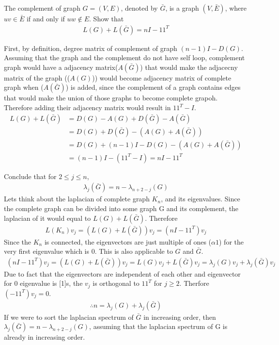 \documentclass{article}
\begin{document}
\begin{problem}
    The complement of graph $G = (V,E)$, denoted by $\bar{G}$, is a graph $(V,\bar{E})$, where $uv \in \bar{E}$ if and only if $uw \notin E$. Show that 
    \begin{align*}
        L(G) + L(\bar{G}) = nI -11^T
    \end{align*}
    
    First, by definition, degree matrix of complement of graph $(n-1)I - D(G)$. Assuming that the graph and the complement do not have self loop, complement graph would have a adjacency matrix($A(\bar{G})$) that would make the adjacecny matrix of the graph (($A(G)$)) would become adjacency matrix of complete graph when ($A(\bar{G})$) is added, since the complement of a graph contains edges that would make the union of those graphs to become complete grapoh. Therefore adding their adjacency matrix would result in $11^T - I$.
    \begin{align*}
        L(G) + L(\bar{G}) &= D(G) - A(G) + D(\bar{G}) - A(\bar{G})\\
        &= D(G) + D(\bar{G}) - (A(G)+ A(\bar{G}))\\
        &= D(G) + (n-1)I - D(G)- (A(G)+ A(\bar{G}))\\
        &= (n-1)I - (11^T - I) = nI -11^T
    \end{align*}

    Conclude that for $2 \leq j \leq n$,
    \begin{align*}
        \lambda_j (\bar{G}) = n - \lambda_{n+2-j}(G)
    \end{align*}
    Lets think about the laplacian of complete graph $K_n$, and its eigenvalues. Since the complete graph can be divided into some graph G and its complement, the laplacian of it would equal to $L(G) + L(\bar{G})$. Therefore 
    \begin{align*}
        L(K_n) v_j = (L(G) + L(\bar{G})) v_j = (nI -11^T) v_j
    \end{align*}
    Since the $K_n$ is connected, the eigenvectors are just multiple of ones ($\alpha 1$) for the very first eigenvalue which is 0. This is also applicable to $G$ and $\bar{G}$.
    \begin{align*}
        (nI -11^T) v_j = (L(G) + L(\bar{G})) v_j = L(G) v_j + L(\bar{G}) v_j = \lambda_j(G) v_j + \lambda_j(\bar{G})v_j 
    \end{align*}
    Due to fact that the eigenvectors are independent of each other and eigenvector for 0 eigenvalue is [1]s, the $v_j$ is orthogonal to $11^T$ for $j \geq 2$. Therfore $(-11^T) v_j = 0$. 
    \begin{align*}
        \therefore n = \lambda_j(G) + \lambda_j(\bar{G})
    \end{align*}
    If we were to sort the laplacian spectrum of $\bar{G}$ in increasing order, then $ \lambda_j(\bar{G}) = n - \lambda_{n + 2 - j}(G)$, assuming that the laplacian spectrum of G is already in increasing order. 
\end{problem}
\end{document}
